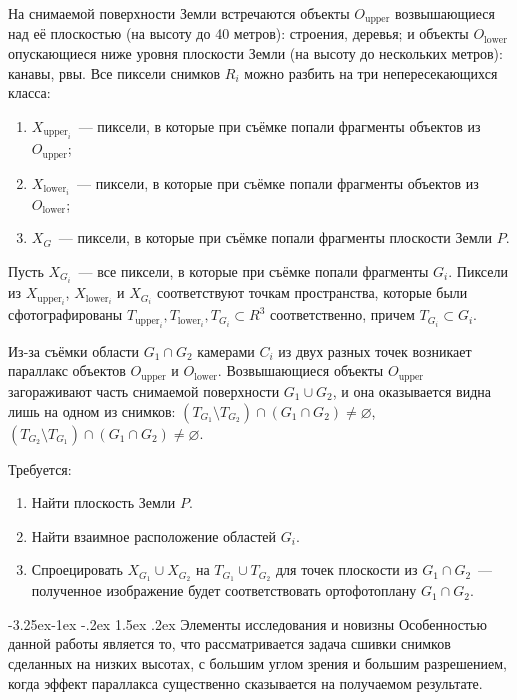 \documentclass[a4paper,10pt]{article}
\makeatletter
\renewcommand\paragraph{\@startsection{paragraph}{4}{\z@}%
  {-3.25ex\@plus -1ex \@minus -.2ex}%
  {1.5ex \@plus .2ex}%
  {\normalfont\normalsize\bfseries}}
\makeatother
\begin{document}
На снимаемой поверхности Земли встречаются объекты $O_{\mathrm{upper}}$ возвышающиеся над её плоскостью (на высоту до 40 метров): 
строения, деревья; 
и объекты $O_{\mathrm{lower}}$ опускающиеся ниже уровня плоскости Земли (на высоту до нескольких метров): канавы, рвы.
Все пиксели снимков $R_i$ можно разбить на три непересекающихся класса: 
\begin{enumerate}[label=\arabic*)]
  \item $X_{\mathrm{upper}_i}$~--- пиксели, в которые при съёмке попали фрагменты объектов из $O_{\mathrm{upper}}$;
  \item $X_{\mathrm{lower}_i}$~--- пиксели, в которые при съёмке попали фрагменты объектов из $O_{\mathrm{lower}}$;
  \item $X_G$~--- пиксели, в которые при съёмке попали фрагменты плоскости Земли $P$.
\end{enumerate}
Пусть $X_{G_i}$~--- все пиксели, в которые при съёмке попали фрагменты $G_i$.
Пиксели из $X_{\mathrm{upper}_i}$, $X_{\mathrm{lower}_i}$ и $X_{G_i}$ 
соответствуют точкам пространства, которые были сфотографированы 
$T_{\mathrm{upper}_i}, T_{\mathrm{lower}_i},  T_{G_i} \subset R^3$ соответственно, 
причем $T_{G_i} \subset G_i$.

Из-за съёмки области $G_1 \cap G_2$ камерами $C_i$ из двух разных точек 
возникает параллакс объектов $O_{\mathrm{upper}}$ и $O_{\mathrm{lower}}$.
Возвышающиеся объекты $O_{\mathrm{upper}}$ загораживают часть снимаемой поверхности $G_1 \cup G_2$, 
и она оказывается видна лишь на одном из снимков: $(T_{G_1} \setminus T_{G_2}) \cap (G_1 \cap G_2) \neq \varnothing$, 
$(T_{G_2} \setminus T_{G_1}) \cap (G_1 \cap G_2) \neq \varnothing$.

Требуется:
\begin{enumerate}
  \item Найти плоскость Земли $P$.
  \item Найти взаимное расположение областей $G_i$.
  \item Спроецировать $X_{G_1} \cup X_{G_2}$ на $T_{G_1} \cup T_{G_2}$ для точек плоскости из $G_1 \cap G_2$~---
  полученное изображение будет соответствовать ортофотоплану $G_1 \cap G_2$.
\end{enumerate}

\paragraph{Элементы исследования и новизны}
Особенностью данной работы является то, 
что рассматривается задача сшивки снимков сделанных на низких высотах, с большим углом зрения
и большим разрешением,
когда эффект параллакса существенно сказывается на получаемом результате.
\end{document}
